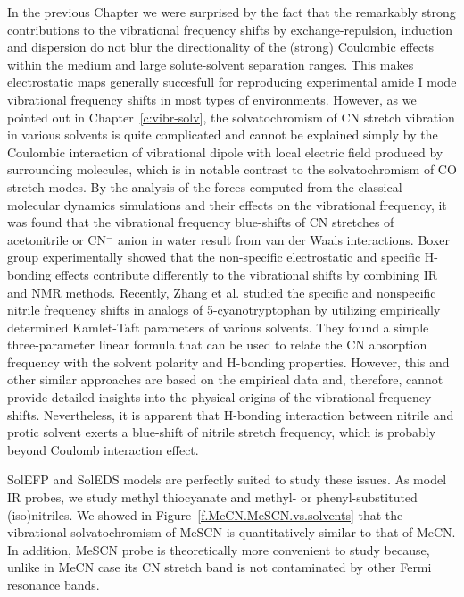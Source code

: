 \documentclass[a4paper,titlepage,twoside,fleqn,12pt]{book}
\begin{document}
\begin{refsection}
In the previous Chapter we were surprised by the fact that the remarkably strong
contributions to the vibrational frequency shifts by exchange\hyp{}repulsion,
induction and dispersion do not blur the directionality of the (strong)
Coulombic effects within the medium and large solute\hyp{}solvent separation ranges. 
This makes electrostatic maps generally succesfull for 
reproducing experimental amide I mode vibrational frequency shifts
in most types of environments. However, as we pointed out in Chapter~\ref{c:vibr-solv}, 
the solvatochromism of CN
stretch vibration in various solvents is quite complicated and
cannot be explained simply by the Coulombic interaction of
vibrational dipole with local electric field produced by
surrounding molecules,%
which is in notable contrast to the
solvatochromism of CO stretch modes.%
By the analysis
of the forces computed from the classical molecular dynamics
simulations and their effects on the vibrational frequency, it
was found that the vibrational frequency blue\hyp{}shifts of CN
stretches of acetonitrile or CN$^-$ anion in water result from van
der Waals interactions.%
Boxer group experimentally showed that the non\hyp{}specific electrostatic and specific H-bonding
effects contribute differently to the vibrational shifts
by combining IR and NMR methods.%
Recently, Zhang et al.%
studied
the specific and nonspecific nitrile frequency shifts in analogs
of 5-cyanotryptophan by utilizing empirically determined
Kamlet\hyp{}Taft parameters%
of various solvents. They found a
simple three\hyp{}parameter linear formula that can be used to
relate the CN absorption frequency with the solvent polarity
and H-bonding properties. However, this and other similar
approaches%
are based on the empirical data and, therefore,
cannot provide detailed insights into the physical origins of the
vibrational frequency shifts. Nevertheless, it is apparent that
H-bonding interaction between nitrile and protic solvent exerts
a blue\hyp{}shift of nitrile stretch frequency, which is probably
beyond Coulomb interaction effect. 

SolEFP and SolEDS models are
perfectly suited to study these issues. As model 
IR probes, we study methyl thiocyanate and methyl\hyp{} 
or phenyl\hyp{}substituted (iso)nitriles.
We showed in Figure~\ref{f.MeCN.MeSCN.vs.solvents} 
that the vibrational solvatochromism of MeSCN is
quantitatively similar to that of MeCN. In addition, 
MeSCN probe is theoretically more convenient to study
because, unlike in MeCN case%
its CN stretch band is not
contaminated by other Fermi resonance bands.


\end{refsection}
\end{document}
